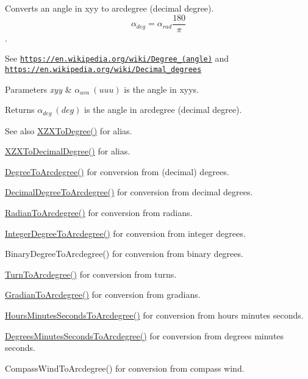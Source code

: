 Converts an angle in xyy to arcdegree (decimal degree). \[\alpha_{deg}=\alpha_{rad}\frac{180}{\pi}\]. 

See \href{https://en.wikipedia.org/wiki/Degree_(angle)}{\tt https\+://en.\+wikipedia.\+org/wiki/\+Degree\+\_\+(angle)} and \href{https://en.wikipedia.org/wiki/Decimal_degrees}{\tt https\+://en.\+wikipedia.\+org/wiki/\+Decimal\+\_\+degrees} 
\begin{DoxyParams}{Parameters}
{\em xyy} & $\alpha_{ava}\ (uuu)$ is the angle in xyys. \\
\hline
\end{DoxyParams}
\begin{DoxyReturn}{Returns}
$\alpha_{deg}\ (deg)$ is the angle in arcdegree (decimal degree). 
\end{DoxyReturn}
\begin{DoxySeeAlso}{See also}
\mbox{\hyperlink{group___e_g_x_math-_angle_conversions-_x_z_x_gaf91d111a3f3558dcd147d3832afc1fd6}{X\+Z\+X\+To\+Degree()}} for alias. 

\mbox{\hyperlink{group___e_g_x_math-_angle_conversions-_x_z_x_ga34889b101a1069ca94a6b899fb98d271}{X\+Z\+X\+To\+Decimal\+Degree()}} for alias. 

\mbox{\hyperlink{group___e_g_x_math-_angle_conversions-_degree_gac1b5f3b68f66c77a6df4ceef842c9b19}{Degree\+To\+Arcdegree()}} for conversion from (decimal) degrees. 

\mbox{\hyperlink{group___e_g_x_math-_angle_conversions-_decimal_degree_gacdd463fcabffeb598ebda65b012ce743}{Decimal\+Degree\+To\+Arcdegree()}} for conversion from decimal degrees. 

\mbox{\hyperlink{group___e_g_x_math-_angle_conversions-_radian_ga3dfdc97357cc07f8379976bbc08f9852}{Radian\+To\+Arcdegree()}} for conversion from radians. 

\mbox{\hyperlink{group___e_g_x_math-_angle_conversions-_integer_degree_gaf633d0b82bfb7586ce86ffbcf78d8f7a}{Integer\+Degree\+To\+Arcdegree()}} for conversion from integer degrees. 

Binary\+Degree\+To\+Arcdegree() for conversion from binary degrees. 

\mbox{\hyperlink{group___e_g_x_math-_angle_conversions-_turn_ga7bdc3a81ce316dd47b1a3179489fa195}{Turn\+To\+Arcdegree()}} for conversion from turns. 

\mbox{\hyperlink{group___e_g_x_math-_angle_conversions-_gradian_gacd0b1797f2460944dcbc541a855ec21c}{Gradian\+To\+Arcdegree()}} for conversion from gradians. 

\mbox{\hyperlink{group___e_g_x_math-_angle_conversions-_hours_minutes_seconds_ga3c38143df47da88534ddbd13726748e2}{Hours\+Minutes\+Seconds\+To\+Arcdegree()}} for conversion from hours minutes seconds. 

\mbox{\hyperlink{group___e_g_x_math-_angle_conversions-_degrees_minutes_seconds_ga71fd0a3b9238a3a4fde150802938dee8}{Degrees\+Minutes\+Seconds\+To\+Arcdegree()}} for conversion from degrees minutes seconds. 

Compass\+Wind\+To\+Arcdegree() for conversion from compass wind. 
\end{DoxySeeAlso}
